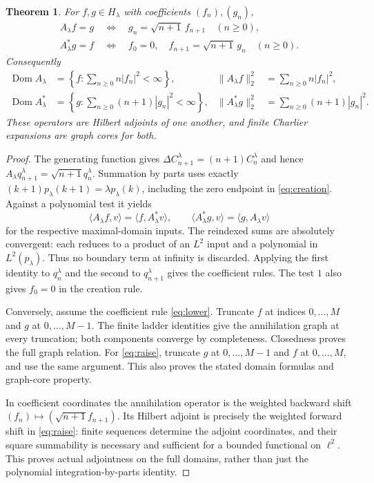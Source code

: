 \documentclass[11pt]{article}
\newtheorem{theorem}{Theorem}[section]
\newcommand{\Dom}{\operatorname{Dom}}
\begin{document}
\begin{theorem}\label{thm:graphs}
For $f,g\in H_\lambda$ with coefficients $(f_n),(g_n)$,
\begin{align}
 A_\lambda f=g
 &\ \Longleftrightarrow\quad
 g_n=\sqrt{n+1}\,f_{n+1}\quad(n\geq0),\label{eq:lower}\\
 A_\lambda^*g=f
 &\ \Longleftrightarrow\quad
 f_0=0,\quad f_{n+1}=\sqrt{n+1}\,g_n\quad(n\geq0).
 \label{eq:raise}
\end{align}
Consequently
\begin{align}
 \Dom A_\lambda&=\left\{f:\sum_{n\geq0}n|f_n|^2<\infty\right\},
 &\|A_\lambda f\|_2^2&=\sum_{n\geq0}n|f_n|^2,\label{eq:Adomain}\\
 \Dom A_\lambda^*&=\left\{g:\sum_{n\geq0}(n+1)|g_n|^2<\infty\right\},
 &\|A_\lambda^*g\|_2^2&=\sum_{n\geq0}(n+1)|g_n|^2.
 \label{eq:Astar}
\end{align}
These operators are Hilbert adjoints of one another, and finite
Charlier expansions are graph cores for both.
\end{theorem}
\begin{proof}
The generating function gives
$\Delta C_{n+1}^\lambda=(n+1)C_n^\lambda$ and hence
$A_\lambda q_{n+1}^\lambda=\sqrt{n+1}q_n^\lambda$.
Summation by parts uses exactly
$(k+1)p_\lambda(k+1)=\lambda p_\lambda(k)$, including the
zero endpoint in \eqref{eq:creation}. Against a polynomial test it yields
\[
 \langle A_\lambda f,v\rangle=\langle f,A_\lambda^*v\rangle,
 \qquad
 \langle A_\lambda^*g,v\rangle=\langle g,A_\lambda v\rangle
\]
for the respective maximal-domain inputs. The reindexed sums are
absolutely convergent: each reduces to a product of an $L^2$ input
and a polynomial in $L^2(p_\lambda)$. Thus no boundary term at infinity
is discarded. Applying the first identity to $q_n^\lambda$ and the
second to $q_{n+1}^\lambda$ gives the coefficient rules. The test $1$
also gives $f_0=0$ in the creation rule.

Conversely, assume the coefficient rule \eqref{eq:lower}. Truncate
$f$ at indices $0,\ldots,M$ and $g$ at $0,\ldots,M-1$.
The finite ladder identities give the annihilation graph at every
truncation; both components converge by completeness. Closedness proves
the full graph relation. For \eqref{eq:raise}, truncate $g$ at
$0,\ldots,M-1$ and $f$ at $0,\ldots,M$, and use the same argument.
This also proves the stated domain formulas and graph-core property.

In coefficient coordinates the annihilation operator is the weighted
backward shift $(f_n)\mapsto(\sqrt{n+1}f_{n+1})$.
Its Hilbert adjoint is precisely the weighted forward shift in
\eqref{eq:raise}: finite sequences determine the adjoint coordinates,
and their square summability is necessary and sufficient for a bounded
functional on $\ell^2$. This proves actual adjointness on the full
domains, rather than just the polynomial integration-by-parts identity.
\end{proof}
\end{document}
